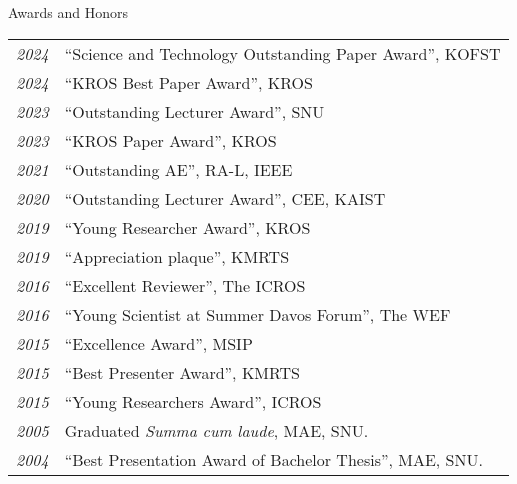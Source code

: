\begin{rSection}{Awards and Honors}
    \begin{tabular}{ @{} >{\itshape}l @{\hspace{6ex}} l }
    2024        & ``Science and Technology Outstanding Paper Award'', \acs{KOFST}\\
    2024        & ``KROS Best Paper Award'', \ac{KROS}\\
    2023        & ``Outstanding Lecturer Award'', SNU\\
    2023        & ``KROS Paper Award'', \ac{KROS}\\
    2021        & ``Outstanding AE'', RA-L, IEEE\\
    2020        & ``Outstanding Lecturer Award'', CEE, KAIST\\
    2019        & ``Young Researcher Award'', \ac{KROS}\\
    2019        & ``Appreciation plaque'', \ac{KMRTS}\\
    2016        & ``Excellent Reviewer'', The \ac{ICROS} \\
    2016        & ``Young Scientist at Summer Davos Forum'', The \ac{WEF} \\
    2015        & ``Excellence Award'', \ac{MSIP} \\
    2015        & ``Best Presenter Award'', \ac{KMRTS}\\
    2015        & ``Young Researchers Award'', \ac{ICROS} \\
    2005        & Graduated {\em Summa cum laude}, MAE, SNU. \\
    2004        & ``Best Presentation Award of Bachelor Thesis'', MAE, SNU. \\
    \end{tabular}
\end{rSection}
